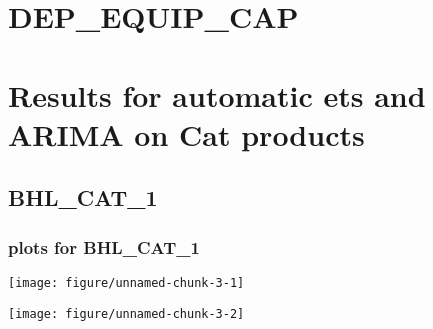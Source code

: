 \documentclass[10pt,a4paper]{article}\usepackage[]{graphicx}\usepackage[]{color}
\makeatletter
\def\maxwidth{ %
  \ifdim\Gin@nat@width>\linewidth
    \linewidth
  \else
    \Gin@nat@width
  \fi
}
\newcommand{\AaA}{\_}
\makeatother
\begin{document}
\newpage



\section{DEP\_EQUIP\_CAP}




\section{Results for automatic ets and ARIMA on Cat products}

\subsection{BHL\AaA CAT\AaA 1}
\subsubsection{plots for BHL\AaA CAT\AaA 1}

\texttt{[image: figure/unnamed-chunk-3-1]} 

\newpage

\texttt{[image: figure/unnamed-chunk-3-2]} 

\newpage
\end{document}
